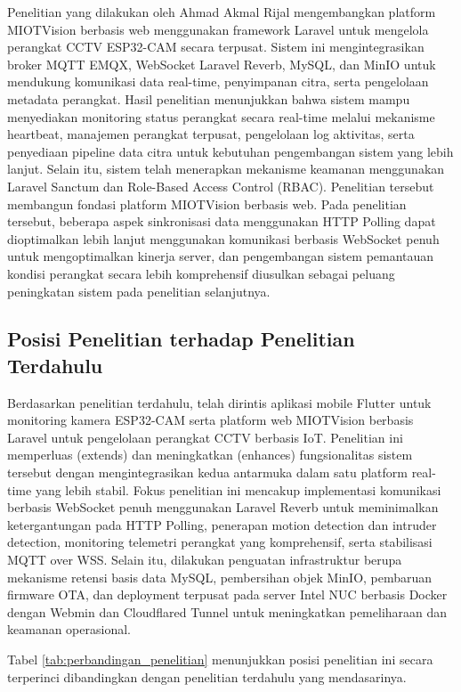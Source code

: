 Penelitian yang dilakukan oleh Ahmad Akmal Rijal mengembangkan platform MIOTVision berbasis web menggunakan framework Laravel untuk mengelola perangkat CCTV ESP32-CAM secara terpusat. Sistem ini mengintegrasikan broker MQTT EMQX, WebSocket Laravel Reverb, MySQL, dan MinIO untuk mendukung komunikasi data real-time, penyimpanan citra, serta pengelolaan metadata perangkat. Hasil penelitian menunjukkan bahwa sistem mampu menyediakan monitoring status perangkat secara real-time melalui mekanisme heartbeat, manajemen perangkat terpusat, pengelolaan log aktivitas, serta penyediaan pipeline data citra untuk kebutuhan pengembangan sistem yang lebih lanjut. Selain itu, sistem telah menerapkan mekanisme keamanan menggunakan Laravel Sanctum dan Role-Based Access Control (RBAC). Penelitian tersebut membangun fondasi platform MIOTVision berbasis web. Pada penelitian tersebut, beberapa aspek sinkronisasi data menggunakan HTTP Polling dapat dioptimalkan lebih lanjut menggunakan komunikasi berbasis WebSocket penuh untuk mengoptimalkan kinerja server, dan pengembangan sistem pemantauan kondisi perangkat secara lebih komprehensif diusulkan sebagai peluang peningkatan sistem pada penelitian selanjutnya. \cite{rijal2025}

\subsection{Posisi Penelitian terhadap Penelitian Terdahulu}

Berdasarkan penelitian terdahulu, telah dirintis aplikasi mobile Flutter untuk monitoring kamera ESP32-CAM serta platform web MIOTVision berbasis Laravel untuk pengelolaan perangkat CCTV berbasis IoT. Penelitian ini memperluas (extends) dan meningkatkan (enhances) fungsionalitas sistem tersebut dengan mengintegrasikan kedua antarmuka dalam satu platform real-time yang lebih stabil. Fokus penelitian ini mencakup implementasi komunikasi berbasis WebSocket penuh menggunakan Laravel Reverb untuk meminimalkan ketergantungan pada HTTP Polling, penerapan motion detection dan intruder detection, monitoring telemetri perangkat yang komprehensif, serta stabilisasi MQTT over WSS. Selain itu, dilakukan penguatan infrastruktur berupa mekanisme retensi basis data MySQL, pembersihan objek MinIO, pembaruan firmware OTA, dan deployment terpusat pada server Intel NUC berbasis Docker dengan Webmin dan Cloudflared Tunnel untuk meningkatkan pemeliharaan dan keamanan operasional.

Tabel \ref{tab:perbandingan_penelitian} menunjukkan posisi penelitian ini secara terperinci dibandingkan dengan penelitian terdahulu yang mendasarinya.

